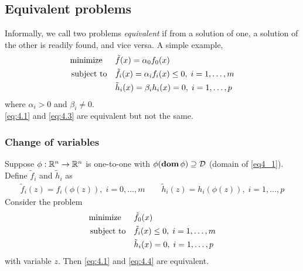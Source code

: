 \subsection{Equivalent problems}
Informally, we call two problems \textit{equivalent} if from a solution of one, a solution of the other is readily found, and vice versa.
A simple example,
\begin{align}
  \text{minimize\;\;}\quad& \tilde{f}(x)  =\alpha_0f_0(x)\nonumber\\
  \text{subject to}  \quad& \tilde{f}_i(x)=\alpha_if_i(x)\le 0,\;i=1,\dots,m\label{eq:4.3}\\
                          & \tilde{h}_i(x)=\beta_ih_i(x)  =  0,\;i=1,\dots,p\nonumber
\end{align}
where $\alpha_i>0$ and $\beta_i\neq 0$.\\
\eqref{eq:4.1} and \eqref{eq:4.3} are equivalent but not the same.
\subsubsection{Change of variables}
Suppose $\phi:\mathbb{R}^n\rightarrow\mathbb{R}^n$ is one-to-one with $\phi(\mathop{\bf dom}\phi)\supseteq\mathcal{D}$ (domain of \ref{eq4_1}).
Define $\tilde{f}_i$ and $\tilde{h}_i$ as
\begin{align*}
  \tilde{f}_i(z)=f_i(\phi(z)),\;i=0,\dots,m\quad\quad\tilde{h}_i(z)=h_i(\phi(z)),\;i=1,\dots,p
\end{align*}
Consider the problem
\begin{align}
  \text{minimize\;\;}\quad& \tilde{f}_0(x)\nonumber\\
  \text{subject to}  \quad& \tilde{f}_i(x)\le 0,\;i=1,\dots,m\label{eq:4.4}\\
                          & \tilde{h}_i(x) =  0,\;i=1,\dots,p\nonumber
\end{align}
with variable $z$. Then \eqref{eq:4.1} and \eqref{eq:4.4} are equivalent.
